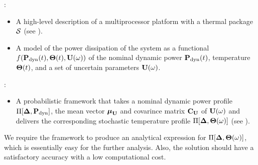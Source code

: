 :
\begin{itemize}
  \item A high-level description of a multiprocessor platform with a thermal package $\mathcal{S}$ (see ).
  \item A model of the power dissipation of the system as a functional $f(\vP_\dyn(\t), \vTO(\t), \vU(\o))$ of the nominal dynamic power $\mathbf{P}_{\text{dyn}}(t)$, temperature ${\boldsymbol\Theta}(t)$, and a set of uncertain parameters $\vU(\o)$.
\end{itemize}

:
\begin{itemize}
  \item A probabilistic framework that takes a nominal dynamic power profile $\prof{\mP_\dyn}$, the mean vector $\vExp_\mrv{\vU}$ and covarince matrix $\mCov_\mrv{\vU}$ of $\vU(\o)$ and delivers the corresponding stochastic temperature profile $\Pi[\boldsymbol{\Delta}, {\boldsymbol\Theta}(\omega)]$ (see ).
\end{itemize}

We require the framework to produce an analytical expression for $\Pi[\boldsymbol{\Delta}, {\boldsymbol\Theta}(\omega)]$, which is essentially easy for the further analysis. Also, the solution should have a satisfactory accuracy with a low computational cost.
